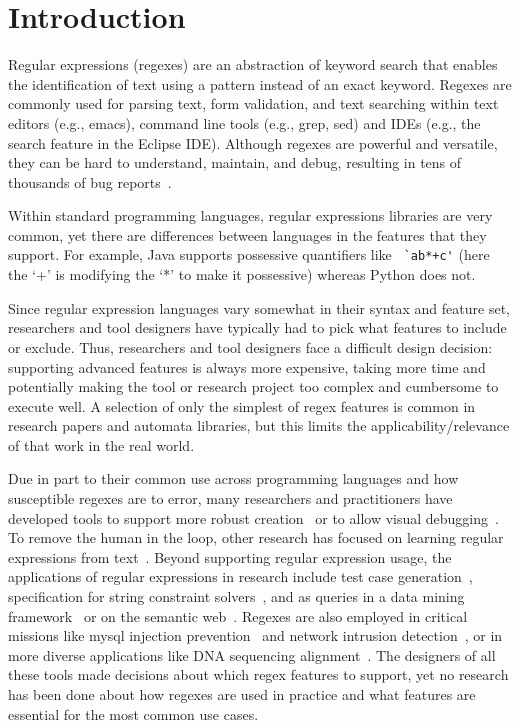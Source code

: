 \section{Introduction }

Regular expressions (regexes) are an abstraction of keyword search that enables the identification of text using a pattern instead of an exact keyword.
Regexes are commonly used for parsing text, form validation, and text searching within text editors (e.g., emacs), command line tools (e.g., grep, sed) and IDEs (e.g., the search feature in the Eclipse IDE).  Although regexes are powerful and versatile, they can be hard to understand,  maintain, and debug, resulting in tens of thousands of bug reports~\cite{Spishak:2012:TSR:2318202.2318207}.

Within standard programming languages, regular expressions libraries are very common, yet there are  differences between languages in the features that they support. For example, Java supports possessive quantifiers like \verb! `ab*+c'! (here the `+' is modifying the `*' to make it possessive) whereas Python does not.


Since  regular expression languages vary somewhat in their syntax and feature set, researchers and tool designers have typically had to pick what features to include or exclude. Thus, researchers and tool designers face a difficult design decision: supporting advanced features is always more expensive, taking more time and potentially making the tool or research project too complex and cumbersome to execute well.  A selection of only the simplest of regex features is common in research papers and automata libraries, but this limits the applicability/relevance of that work in the real world.

Due in part to their common use across programming languages and how susceptible regexes are to error, many researchers and practitioners have developed tools to support more robust creation~\cite{Spishak:2012:TSR:2318202.2318207} or to allow visual debugging~\cite{Beck:2014:RVD:2591062.2591111}. To remove the human in the loop, other research has focused on learning regular expressions from  text~\cite{Babbar:2010:CBA:1871840.1871848, Li:2008:REL:1613715.1613719}.
Beyond supporting regular expression usage, the applications of regular expressions in research include test case generation~\cite{Ghosh:2013:JAT:2486788.2486925, Galler:2014:STD:2683035.2683100, Anand:2013:OSM:2503903.2503991, Tillmann:2014:TAT:2642937.2642941},
specification for string constraint solvers~\cite{Trinh:2014:SSS:2660267.2660372, hampi}, and as queries in a data mining framework~\cite{Begel:2010:CDE:1806799.1806821} or on the semantic web~\cite{Lee:2010:PSQ:1871871.1871877}.
Regexes are also employed in critical missions like mysql injection prevention~\cite{Yeole:2011:ADT:1980022.1980229} and network intrusion detection~\cite{network}, or in more diverse applications like DNA sequencing alignment~\cite{1594922}.
The designers of all these tools made decisions about which regex features to support, yet no research has been done about how regexes are used in practice and what features are essential for the most common use cases.

